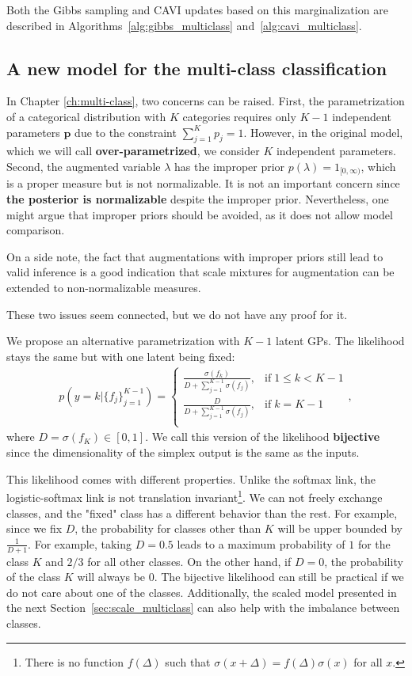 Both the Gibbs sampling and \ac{CAVI} updates based on this marginalization are described in Algorithms~\ref{alg:gibbs_multiclass} and~\ref{alg:cavi_multiclass}.


\subsection{A new model for the multi-class classification}
\label{sec:simplex}
In Chapter \ref{ch:multi-class}, two concerns can be raised.
First, the parametrization of a categorical distribution with $K$ categories requires only $K-1$ independent parameters $\boldsymbol{p}$ due to the constraint $\sum_{j=1}^K p_j = 1$.
However, in the original model, which we will call \textbf{over-parametrized}, we consider $K$ independent parameters.
Second, the augmented variable $\lambda$ has the improper prior $p(\lambda) = 1_{[0,\infty)}$, which is a proper measure but is not normalizable.
It is not an important concern since \textbf{the posterior is normalizable} despite the improper prior.
Nevertheless, one might argue that improper priors should be avoided, as it does not allow model comparison.

On a side note, the fact that augmentations with improper priors still lead to valid inference is a good indication that scale mixtures for augmentation can be extended to non-normalizable measures.

These two issues seem connected, but we do not have any proof for it.

We propose an alternative parametrization with $K-1$ latent \acp{GP}.
The likelihood stays the same but with one latent being fixed:
\begin{align}
    p(y=k|\{f_j\}_{j=1}^{K-1}) = \left\{
        \begin{array}{cc}
            \frac{\sigma(f_k)}{D + \sum_{j=1}^{K-1}\sigma(f_j)}, & \mathrm{if}\; 1 \leq k < K - 1\\
            \frac{D}{D + \sum_{j=1}^{K-1}\sigma(f_j)}, & \mathrm{if}\; k = K - 1 \\
    \end{array}
    \right.,\label{eq:simplex_multiclass}
\end{align}
where $D = \sigma(f_K) \in [0, 1]$.
We call this version of the likelihood \textbf{bijective} since the dimensionality of the simplex output is the same as the inputs.

This likelihood comes with different properties.
Unlike the softmax link, the logistic-softmax link is not translation invariant\footnote{There is no function $f(\Delta)$ such that $\sigma(x + \Delta) = f(\Delta)\sigma(x)$ for all $x$.}.
We can not freely exchange classes, and the "fixed" class has a different behavior than the rest.
For example, since we fix $D$, the probability for classes other than $K$ will be upper bounded by $\frac{1}{D + 1}$.
For example, taking $D=0.5$ leads to a maximum probability of $1$ for the class $K$ and $2/3$ for all other classes.
On the other hand, if $D=0$, the probability of the class $K$ will always be $0$.
The bijective likelihood can still be practical if we do not care about one of the classes.
Additionally, the scaled model presented in the next Section~\ref{sec:scale_multiclass} can also help with the imbalance between classes.

